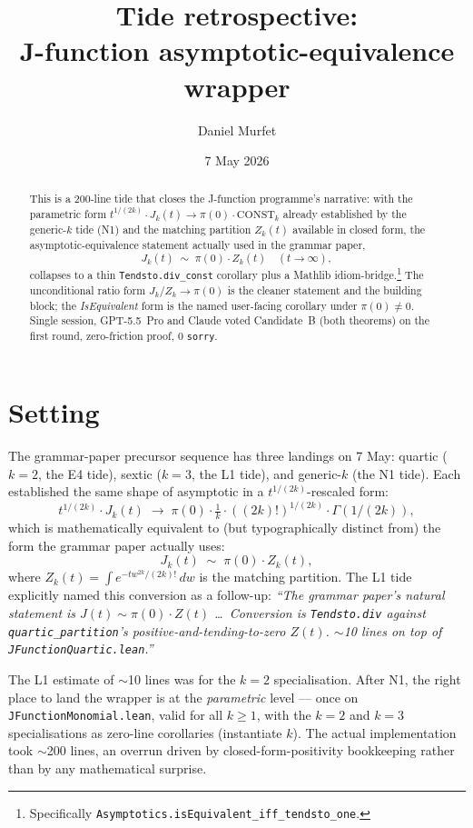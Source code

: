 \documentclass[11pt]{article}
\title{Tide retrospective:\\J-function asymptotic-equivalence wrapper}
\author{Daniel Murfet}
\date{7 May 2026}
\begin{document}
\maketitle

\begin{abstract}
This is a 200-line tide that closes the J-function programme's
narrative: with the parametric form $t^{1/(2k)} \cdot J_k(t) \to \pi(0)
\cdot \mathrm{CONST}_k$ already established by the generic-$k$ tide
(N1) and the matching partition $Z_k(t)$ available in closed form,
the asymptotic-equivalence statement actually used in the grammar
paper,
\[
  J_k(t) \;\sim\; \pi(0) \cdot Z_k(t) \quad (t \to \infty),
\]
collapses to a thin \texttt{Tendsto.div\_const} corollary plus a
Mathlib idiom-bridge.\footnote{Specifically
\texttt{Asymptotics.isEquivalent\_iff\_tendsto\_one}.} The
unconditional ratio form $J_k/Z_k \to \pi(0)$ is the cleaner
statement and the building block; the \emph{IsEquivalent} form is the
named user-facing corollary under $\pi(0) \neq 0$. Single session,
GPT-5.5~Pro and Claude voted Candidate~B (both theorems) on the first
round, zero-friction proof, 0 \texttt{sorry}.
\end{abstract}

\section{Setting}

The grammar-paper precursor sequence has three landings on 7 May:
quartic ($k=2$, the E4 tide), sextic ($k=3$, the L1 tide), and
generic-$k$ (the N1 tide). Each established the same shape of
asymptotic in a $t^{1/(2k)}$-rescaled form:
\[
  t^{1/(2k)} \cdot J_k(t) \;\longrightarrow\; \pi(0) \cdot
  \tfrac{1}{k} \cdot ((2k)!)^{1/(2k)} \cdot \Gamma(1/(2k)),
\]
which is mathematically equivalent to (but typographically distinct
from) the form the grammar paper actually uses:
\[
  J_k(t) \;\sim\; \pi(0) \cdot Z_k(t),
\]
where $Z_k(t) = \int e^{-tw^{2k}/(2k)!}\,dw$ is the matching
partition. The L1 tide explicitly named this conversion as a
follow-up: \emph{``The grammar paper's natural statement is $J(t) \sim
\pi(0) \cdot Z(t)$ \ldots\ Conversion is \texttt{Tendsto.div} against
\texttt{quartic\_partition}'s positive-and-tending-to-zero $Z(t)$.
$\sim$10 lines on top of \texttt{JFunctionQuartic.lean}.''}

The L1 estimate of $\sim$10 lines was for the $k=2$ specialisation.
After N1, the right place to land the wrapper is at the
\emph{parametric} level — once on
\texttt{JFunctionMonomial.lean}, valid for all $k \geq 1$, with the
$k=2$ and $k=3$ specialisations as zero-line corollaries (instantiate
$k$). The actual implementation took $\sim$200 lines, an overrun
driven by closed-form-positivity bookkeeping rather than by any
mathematical surprise.
\end{document}
